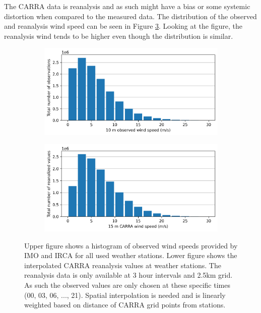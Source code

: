 The CARRA data is reanalysis and as such might have a bias or some systemic distortion when compared to the measured data. The distribution of the observed and reanalysis wind speed can be seen in Figure \ref{fig:obs_carra_wind_speeds}. Looking at the figure, the reanalysis wind tends to be higher even though the distribution is similar. 

\begin{figure}[ht]
    \centering
    \begin{subfigure}[b]{0.8\textwidth}
        \centering
        \includegraphics[width=\textwidth]{Figures/obs_wind_speeds.png}
        \label{fig:obs_wind_speeds}
    \end{subfigure}
    
    \vspace{0.5cm} %

    \begin{subfigure}[b]{0.8\textwidth}
        \centering
        \includegraphics[width=\textwidth]{Figures/carra_wind_speeds.png}
        \label{fig:carra_wind_speeds}
    \end{subfigure}

    \caption[Distribution of CARRA and observed wind speeds]{Upper figure shows a histogram of observed wind speeds provided by IMO and IRCA for all used weather stations. Lower figure shows the interpolated CARRA reanalysis values at weather stations. The reanalysis data is only available at 3 hour intervals and 2.5km grid. As such the observed values are only chosen at these specific times (00, 03, 06, ..., 21). Spatial interpolation is needed and is linearly weighted based on distance of CARRA grid points from stations.}
    \label{fig:obs_carra_wind_speeds}
\end{figure}

